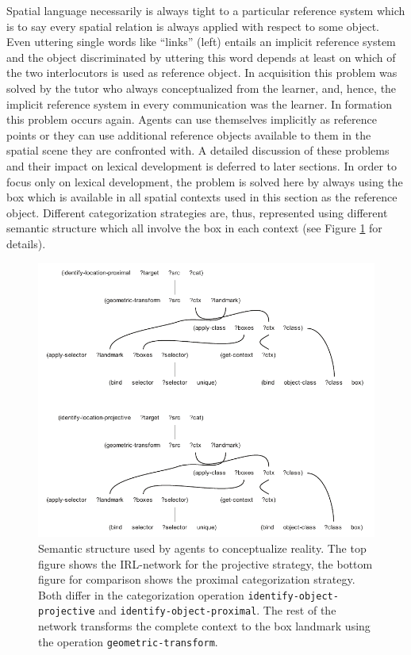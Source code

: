 Spatial language necessarily is always tight to a particular reference system which
is to say every spatial relation is always applied with respect to some
object. Even uttering single words like ``links'' (left) entails an implicit reference
system and the object discriminated by uttering this word depends at least on which
of the two interlocutors is used as reference object. In acquisition this problem 
was solved by the tutor who always conceptualized from the learner, and, hence, 
the implicit reference system in every communication was the learner. In formation
this problem occurs again. Agents can use themselves implicitly as reference points
or they can use additional reference objects available to them in the spatial
scene they are confronted with. A detailed discussion of these
problems and their impact on lexical development is deferred to later sections. 
In order to focus only on lexical development, the problem is solved here by 
always using the box which is available in all spatial
contexts used in this section as the reference object. Different categorization 
strategies are, thus, represented using different semantic structure which all 
involve the box in each context (see Figure \ref{f:categorization-strategies} for
details).

\begin{figure}
\begin{center}
\includegraphics[width=1.0\columnwidth]{figs/category-formation-categorization-strategies}
\end{center}
\caption[Example strategies used in conceptualization]{%
Semantic structure used by agents to conceptualize reality. The top figure
shows the IRL-network for the projective strategy, the bottom figure for
comparison shows the proximal categorization strategy. Both differ in 
the categorization operation {\footnotesize\tt identify-object-projective} and
{\footnotesize\tt identify-object-proximal}. The rest of the network
transforms the complete context to the box landmark using the operation 
{\footnotesize\tt geometric-transform}.}
\label{f:categorization-strategies}
\end{figure}

